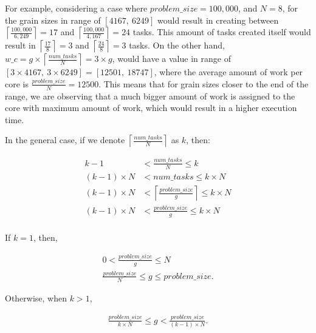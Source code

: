 For example, considering a case where $problem\_{size}=100,000$, and $N=8$, for the grain sizes in range of $[4167,\:6249]$ would result in creating between $\left \lceil{\frac{100,000}{6,249}}\right \rceil=17$ and  $\left \lceil{\frac{100,000}{4,167}}\right \rceil=24$ tasks. This amount of tasks created itself would result in $\left \lceil{\frac{17}{8}}\right \rceil=3$ and  $\left \lceil{\frac{24}{8}}\right \rceil=3$ tasks.
On the other hand, $w\_c=g\times{\left \lceil{\frac{num\_{tasks}}{N}}\right \rceil}=3\times{g}$, would have a value in range of $[3\times4167,\:3\times6249]=[12501,\: 18747]$, where the average amount of work per core is $\frac{problem\_{size}}{N}=12500$. This means that for grain sizes closer to the end of the range, we are observing that a much bigger amount of work is assigned to the core with maximum amount of work, which would result in a higher execution time. 


In the general case, if we denote $\left \lceil{\frac{num\_{tasks}}{N}}\right \rceil$ as $k$, then:


\begin{equation}\label{formula8}
\begin{aligned}
k-1&<{\frac{num\_{tasks}}{N}}\leq{k}\\
(k-1)\times{N}&<num\_{tasks}\leq{k}\times{N}\\
(k-1)\times{N}&<\left \lceil{\frac{problem\_{size}}{g}}\right \rceil\leq{k}\times{N}\\
(k-1)\times{N}&<\frac{problem\_{size}}{g}\leq{{k}\times{N}}\\
\end{aligned}
\end{equation}

If $k=1$, then, 

\begin{equation}\label{formula9}
\begin{aligned}
0<\frac{problem\_{size}}{g}\leq{N}\\
\frac{problem\_{size}}{N}\leq{g}\leq{problem\_{size}}.
\end{aligned}
\end{equation}

Otherwise, when $k>1$,

\begin{equation}\label{formula10}
\begin{aligned}
\frac{problem\_{size}}{k\times{N}}\leq{g}<\frac{problem\_{size}}{(k-1)\times{N}}.
\end{aligned}
\end{equation}

